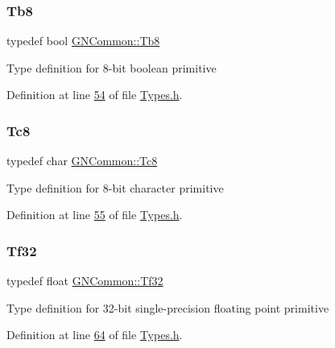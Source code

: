 \subsubsection{\texorpdfstring{Tb8}{Tb8}}
{\footnotesize\ttfamily typedef bool \mbox{\hyperlink{namespace_g_n_common_a8115dc7ed53b6e5b52e6bfde1632ea74}{G\+N\+Common\+::\+Tb8}}}

Type definition for 8-\/bit boolean primitive 

Definition at line \mbox{\hyperlink{_types_8h_source_l00054}{54}} of file \mbox{\hyperlink{_types_8h_source}{Types.\+h}}.

\mbox{\label{namespace_g_n_common_a2d8d4c56e54519697c6ee80cc1ceda76}} 
\subsubsection{\texorpdfstring{Tc8}{Tc8}}
{\footnotesize\ttfamily typedef char \mbox{\hyperlink{namespace_g_n_common_a2d8d4c56e54519697c6ee80cc1ceda76}{G\+N\+Common\+::\+Tc8}}}

Type definition for 8-\/bit character primitive 

Definition at line \mbox{\hyperlink{_types_8h_source_l00055}{55}} of file \mbox{\hyperlink{_types_8h_source}{Types.\+h}}.

\mbox{\label{namespace_g_n_common_ae4ffdde6236eb7578669b280a5d1634d}} 
\subsubsection{\texorpdfstring{Tf32}{Tf32}}
{\footnotesize\ttfamily typedef float \mbox{\hyperlink{namespace_g_n_common_ae4ffdde6236eb7578669b280a5d1634d}{G\+N\+Common\+::\+Tf32}}}

Type definition for 32-\/bit single-\/precision floating point primitive 

Definition at line \mbox{\hyperlink{_types_8h_source_l00064}{64}} of file \mbox{\hyperlink{_types_8h_source}{Types.\+h}}.

\mbox{\label{namespace_g_n_common_a73af96f1663fd8fc5741bcbc5b1427e4}} 
